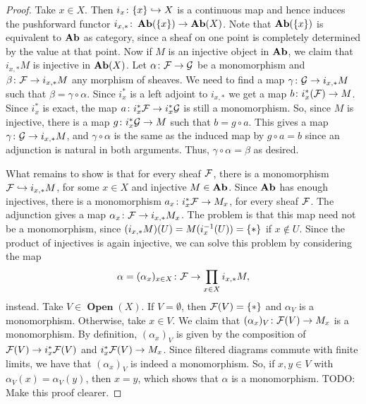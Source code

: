 \documentclass{article}
\DeclareMathOperator{\Open}{\mathbf{Open}}
\begin{document}
\begin{proof}
    Take $x\in X$. Then $i_{x}\colon \{x\} \hookrightarrow X$ is
    a continuous map and hence induces
    the pushforward functor $i_{x,*} \colon \operatorname{\mathbf{Ab}}(\{x\}) \to \operatorname{\mathbf{Ab}}(X)$.
    Note that $\operatorname{\mathbf{Ab}}(\{x\})$ is equivalent to $\operatorname{\mathbf{Ab}}$ as category,
    since a sheaf on one point is completely determined
    by the value at that point.
    Now if $M$ is an injective object in $\operatorname{\mathbf{Ab}}$, we claim that $i_{x,*}M$ is injective
    in $\operatorname{\mathbf{Ab}}(X)$. Let $\alpha \colon \mathcal{F} \to \mathcal{G}$ be a monomorphism and
    $\beta\colon \mathcal{F} \to i_{x, *}M$ any morphism of sheaves. We need to
    find a map $\gamma \colon \mathcal{G} \to i_{x, *}M$ such that $\beta = \gamma\circ \alpha$.
    Since $i_x^*$ is a left adjoint to $i_{x, *}$ we get a map
    $b \colon i_x^*(\mathcal{F}) \to M$. Since $i_x^*$ is exact, the map
    $a \colon i_x^*\mathcal{F} \to i_x^*\mathcal{G}$ is still a monomorphism. So,
    since $M$ is injective, there is a map $g\colon i_x^*\mathcal{G} \to M$
    such that $b = g\circ a$. This gives a map $\gamma \colon \mathcal{G} \to i_{x, *}M$,
    and $\gamma \circ \alpha$ is the same as the induced map by $g\circ a = b$
    since an adjunction is natural in both arguments.
    Thus, $\gamma \circ \alpha = \beta$ as desired.

    What remains to show is that for every sheaf $\mathcal{F}$, there is a monomorphism
    $\mathcal{F} \hookrightarrow i_{x, *}M$, for some $x\in X$ and injective $M\in \operatorname{\mathbf{Ab}}$.
    Since $\operatorname{\mathbf{Ab}}$ has enough injectives, there is a monomorphism $a_x\colon i_x^*\mathcal{F} \to M_x$,
    for every sheaf $\mathcal{F}$. The adjunction gives a map $\alpha_x\colon \mathcal{F} \to i_{x,*}M_x$.
    The problem is that this map need not be a monomorphism,
    since $(i_{x, *}M)(U) = M(i_x^{-1}(U)) = \{*\}$ if $x\notin U$.
    Since the product of injectives is again injective, we can solve this
    problem by considering the map
    \begin{equation*}
        \alpha = (\alpha_x)_{x\in X} \colon \mathcal{F} \to \prod\limits_{x\in X}i_{x,*}M,
    \end{equation*}
    instead. Take $V \in \Open(X)$. If $V = \emptyset$, then $\mathcal{F}(V) = \{*\}$
    and $\alpha_V$ is a monomorphism. Otherwise, take $x\in V$. We claim
    that $(\alpha_x)_V \colon \mathcal{F}(V) \to M_x$ is a monomorphism. By definition,
    $(\alpha_x)_V$ is given by the composition of $\mathcal{F}(V) \to i_x^*\mathcal{F}(V)$
    and $i_x^*\mathcal{F}(V) \to M_x$. Since filtered diagrams commute with
    finite limits, we have that $(\alpha_x)_V$ is indeed a monomorphism.
    So, if $x,y\in V$ with $\alpha_V(x) = \alpha_V(y)$, then $x=y$,
    which shows that $\alpha$ is a monomorphism.
    TODO: Make this proof clearer.
\end{proof}
\end{document}
